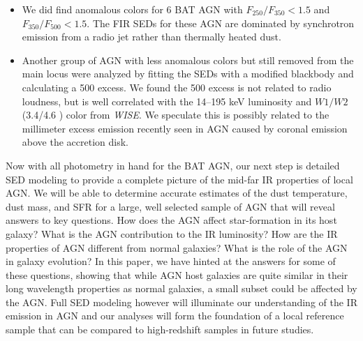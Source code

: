 \begin{itemize}
\item We did find anomalous colors for 6 BAT AGN with $F_{250}/F_{350} < 1.5$ and $F_{350}/F_{500} < 1.5$. The FIR SEDs for these AGN are dominated by synchrotron emission from a radio jet rather than thermally heated dust.

\item Another group of AGN with less anomalous colors but still removed from the main locus were analyzed by fitting the SEDs with a modified blackbody and calculating a 500 \um{} excess. We found the 500 \um{} excess is not related to radio loudness, but is well correlated with the 14--195 keV luminosity and $W1/W2$ (3.4/4.6 \um) color from \textit{WISE}. We speculate this is possibly related to the millimeter excess emission recently seen in AGN caused by coronal emission above the accretion disk.
\end{itemize}

Now with all \herschel{} photometry in hand for the BAT AGN, our next step is detailed SED modeling to provide a complete picture of the mid-far IR properties of local AGN. We will be able to determine accurate estimates of the dust temperature, dust mass, and SFR for a large, well selected sample of AGN that will reveal answers to key questions. How does the AGN affect star-formation in its host galaxy? What is the AGN contribution to the IR luminosity? How are the IR properties of AGN different from normal galaxies? What is the role of the AGN in galaxy evolution? In this paper, we have hinted at the answers for some of these questions, showing that while AGN host galaxies are quite similar in their long wavelength properties as normal galaxies, a small subset could be affected by the AGN. Full SED modeling however will illuminate our understanding of the IR emission in AGN and our analyses will form the foundation of a local reference sample that can be compared to high-redshift samples in future studies.
  
  
  